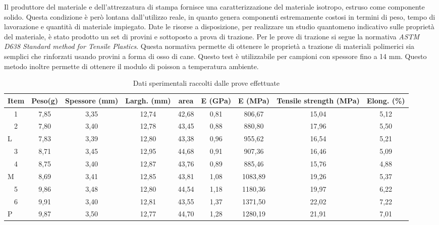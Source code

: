 \documentclass[%
corpo=11pt,
twoside,
 stile=classica,
oldstyle,
greek,%
]{toptesi}
\begin{document}
	
	Il produttore del materiale e dell'attrezzatura di stampa fornisce una caratterizzazione del materiale isotropo, estruso come componente solido. Questa condizione è però lontana dall'utilizzo reale, in quanto genera componenti estremamente costosi in termini di peso, tempo di lavorazione e quantità di materiale impiegato. 
	Date le risorse a disposizione, per realizzare un studio quantomeno indicativo sulle proprietà del materiale, è stato prodotto un set di provini e sottoposto a prova di trazione.
	Per le prove di trazione si segue la normativa \textit{ASTM D638 Standard method for Tensile Plastics}. Questa normativa permette di ottenere le proprietà a trazione di materiali polimerici sia semplici che rinforzati usando provini a forma di osso di cane. Questo test è utilizzabile per campioni con spessore fino a 14 mm. Questo metodo inoltre permette di ottenere il modulo di poisson a temperatura ambiente. 
\begin{table}[htbp]
	\centering
	\caption{Dati sperimentali raccolti dalle prove effettuate}
	\begin{tabular}{|p{3.5em}|c|c|c|c|c|c|c|c|}
		\hline
		Item & \multicolumn{1}{p{3.5em}|}{Peso(g)} & \multicolumn{1}{p{3.5em}|}{Spessore (mm)} & \multicolumn{1}{p{3.5em}|}{Largh. (mm)} & \multicolumn{1}{p{3.5em}|}{area} & \multicolumn{1}{p{3.5em}|}{E (GPa)} & \multicolumn{1}{p{3.5em}|}{E (MPa)} & \multicolumn{1}{p{3.5em}|}{Tensile strength (MPa)} & \multicolumn{1}{p{3.5em}|}{Elong. (\%)} \bigstrut\\
		\hline
		\multicolumn{1}{|c|}{1} & 7,85  & 3,35  & 12,74 & 42,68 & 0,81  & 806,67 & 15,04 & 5,12 \bigstrut\\
		\hline
		\multicolumn{1}{|c|}{2} & 7,80  & 3,40  & 12,78 & 43,45 & 0,88  & 880,80 & 17,96 & 5,50 \bigstrut\\
		\hline
		L     & 7,83  & 3,39  & 12,80 & 43,38 & 0,96  & 955,62 & 16,54 & 5,21 \bigstrut\\
		\hline
		\multicolumn{1}{|c|}{3} & 8,71  & 3,45  & 12,95 & 44,68 & 0,91  & 907,36 & 16,46 & 5,09 \bigstrut\\
		\hline
		\multicolumn{1}{|c|}{4} & 8,75  & 3,40  & 12,87 & 43,76 & 0,89  & 885,46 & 15,76 & 4,88 \bigstrut\\
		\hline
		M     & 8,69  & 3,41  & 12,85 & 43,81 & 1,08  & 1083,89 & 19,26 & 5,37 \bigstrut\\
		\hline
		\multicolumn{1}{|c|}{5} & 9,86  & 3,48  & 12,80 & 44,54 & 1,18  & 1180,36 & 19,97 & 6,22 \bigstrut\\
		\hline
		\multicolumn{1}{|c|}{6} & 9,91  & 3,40  & 12,81 & 43,55 & 1,37  & 1371,50 & 22,02 & 7,22 \bigstrut\\
		\hline
		P     & 9,87  & 3,50  & 12,77 & 44,70 & 1,28  & 1280,19 & 21,91 & 7,01 \bigstrut\\
		\hline
	\end{tabular}%
	\label{tab:testdata}%
\end{table}%
\end{document}
